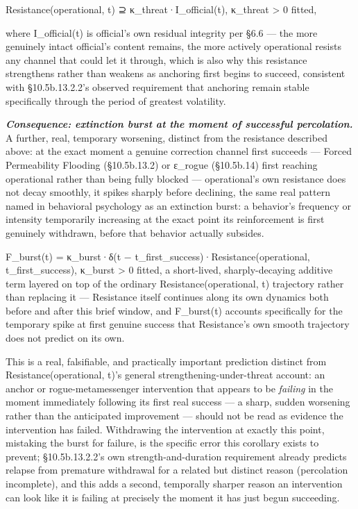 \documentclass[
]{article}
\begin{document}
Resistance(operational, t) ⊇ κ\_threat·I\_official(t), κ\_threat
\textgreater{} 0 fitted,

where I\_official(t) is official's own residual integrity per §6.6 ---
the more genuinely intact official's content remains, the more actively
operational resists any channel that could let it through, which is also
why this resistance strengthens rather than weakens as anchoring first
begins to succeed, consistent with §10.5b.13.2.2's observed requirement
that anchoring remain stable specifically through the period of greatest
volatility.

\emph{\textbf{Consequence: extinction burst at the moment of successful
percolation.}} A further, real, temporary worsening, distinct from the
resistance described above: at the exact moment a genuine correction
channel first succeeds --- Forced Permeability Flooding (§10.5b.13.2) or
ε\_rogue (§10.5b.14) first reaching operational rather than being fully
blocked --- operational's own resistance does not decay smoothly, it
spikes sharply before declining, the same real pattern named in
behavioral psychology as an extinction burst: a behavior's frequency or
intensity temporarily increasing at the exact point its reinforcement is
first genuinely withdrawn, before that behavior actually subsides.

F\_burst(t) = κ\_burst·δ(t − t\_first\_success)·Resistance(operational,
t\_first\_success), κ\_burst \textgreater{} 0 fitted, a short-lived,
sharply-decaying additive term layered on top of the ordinary
Resistance(operational, t) trajectory rather than replacing it ---
Resistance itself continues along its own dynamics both before and after
this brief window, and F\_burst(t) accounts specifically for the
temporary spike at first genuine success that Resistance's own smooth
trajectory does not predict on its own.

This is a real, falsifiable, and practically important prediction
distinct from Resistance(operational, t)'s general
strengthening-under-threat account: an anchor or rogue-metamessenger
intervention that appears to be \emph{failing} in the moment immediately
following its first real success --- a sharp, sudden worsening rather
than the anticipated improvement --- should not be read as evidence the
intervention has failed. Withdrawing the intervention at exactly this
point, mistaking the burst for failure, is the specific error this
corollary exists to prevent; §10.5b.13.2.2's own strength-and-duration
requirement already predicts relapse from premature withdrawal for a
related but distinct reason (percolation incomplete), and this adds a
second, temporally sharper reason an intervention can look like it is
failing at precisely the moment it has just begun succeeding.
\end{document}
